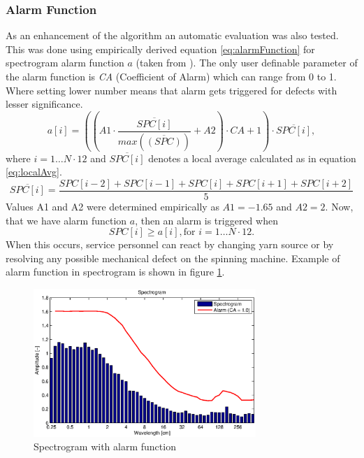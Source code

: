 \documentclass[twoside]{ctuthesis}
\theoremstyle{plain}
\theoremstyle{definition}
\theoremstyle{note}
\begin{document}
\subsubsection{Alarm Function}
As an enhancement of the algorithm an automatic evaluation was also tested. This was done using empirically derived equation \ref{eq:alarmFunction} for spectrogram alarm function $a$ (taken from \cite{cite:1}). The only user definable parameter of the alarm function is \textit{CA} (Coefficient of Alarm) which can range from 0 to 1. Where setting lower number means that alarm gets triggered for defects with lesser significance.
\begin{equation} \label{eq:alarmFunction}
a[i] = \left(\left( A1\cdot \frac{\overline{SPC[i]}}{max(\overline{(SPC)})}+A2\right) \cdot CA + 1 \right) \cdot \overline{SPC[i]},
\end{equation}
where $i=1\ldots N \cdot 12$ and $\overline{SPC[i]}$ denotes a local average calculated as in equation \ref{eq:localAvg}.
\begin{equation} \label{eq:localAvg}
\overline{SPC[i]} = \frac{SPC[i-2]+SPC[i-1]+SPC[i]+SPC[i+1]+SPC[i+2]}{5}
\end{equation}
Values A1 and A2 were determined empirically as $A1=-1.65$ and $A2=2$.
Now, that we have alarm function $a$, then an alarm is triggered when
\begin{equation} \label{eq:alarmTrig}
SPC[i] \geq a[i], \text{for } i=1\ldots N \cdot 12.
\end{equation}
When this occurs, service personnel can react by changing yarn source or by resolving any possible mechanical defect on the spinning machine. Example of alarm function in spectrogram is shown in figure \ref{fig:alarm1}.
\begin{figure}[h]
	\centering
	\includegraphics[width=0.75\textwidth]{prize1_alarm.eps}
	\caption{Spectrogram with alarm function}
	\label{fig:alarm1}
\end{figure}
\end{document}
